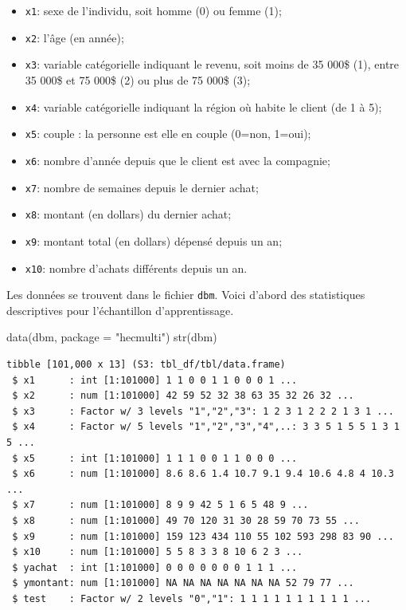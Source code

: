 \documentclass[
  11pt,
  letterpaper,
]{scrbook}
\newenvironment{Shaded}{\begin{snugshade}}{\end{snugshade}}
\newcommand{\AttributeTok}[1]{\textcolor[rgb]{0.40,0.45,0.13}{#1}}
\newcommand{\FunctionTok}[1]{\textcolor[rgb]{0.28,0.35,0.67}{#1}}
\newcommand{\NormalTok}[1]{\textcolor[rgb]{0.00,0.23,0.31}{#1}}
\newcommand{\StringTok}[1]{\textcolor[rgb]{0.13,0.47,0.30}{#1}}
\providecommand{\tightlist}{%
  \setlength{\itemsep}{0pt}\setlength{\parskip}{0pt}}\usepackage{longtable,booktabs,array}
\theoremstyle{definition}
\theoremstyle{remark}
\begin{document}
\begin{itemize}
\tightlist
\item
  \texttt{x1}: sexe de l'individu, soit homme (0) ou femme (1);
\item
  \texttt{x2}: l'âge (en année);
\item
  \texttt{x3}: variable catégorielle indiquant le revenu, soit moins de
  35 000\$ (1), entre 35 000\$ et 75 000\$ (2) ou plus de 75 000\$ (3);
\item
  \texttt{x4}: variable catégorielle indiquant la région où habite le
  client (de 1 à 5);
\item
  \texttt{x5}: couple : la personne est elle en couple (0=non, 1=oui);
\item
  \texttt{x6}: nombre d'année depuis que le client est avec la
  compagnie;
\item
  \texttt{x7}: nombre de semaines depuis le dernier achat;
\item
  \texttt{x8}: montant (en dollars) du dernier achat;
\item
  \texttt{x9}: montant total (en dollars) dépensé depuis un an;
\item
  \texttt{x10}: nombre d'achats différents depuis un an.
\end{itemize}

Les données se trouvent dans le fichier \texttt{dbm}. Voici d'abord des
statistiques descriptives pour l'échantillon d'apprentissage.

\begin{Shaded}
\begin{Highlighting}[]
\FunctionTok{data}\NormalTok{(dbm, }\AttributeTok{package =} \StringTok{"hecmulti"}\NormalTok{)}
\FunctionTok{str}\NormalTok{(dbm)}
\end{Highlighting}
\end{Shaded}

\begin{verbatim}
tibble [101,000 x 13] (S3: tbl_df/tbl/data.frame)
 $ x1      : int [1:101000] 1 1 0 0 1 1 0 0 0 1 ...
 $ x2      : num [1:101000] 42 59 52 32 38 63 35 32 26 32 ...
 $ x3      : Factor w/ 3 levels "1","2","3": 1 2 3 1 2 2 2 1 3 1 ...
 $ x4      : Factor w/ 5 levels "1","2","3","4",..: 3 3 5 1 5 5 1 3 1 5 ...
 $ x5      : int [1:101000] 1 1 1 0 0 1 1 0 0 0 ...
 $ x6      : num [1:101000] 8.6 8.6 1.4 10.7 9.1 9.4 10.6 4.8 4 10.3 ...
 $ x7      : num [1:101000] 8 9 9 42 5 1 6 5 48 9 ...
 $ x8      : num [1:101000] 49 70 120 31 30 28 59 70 73 55 ...
 $ x9      : num [1:101000] 159 123 434 110 55 102 593 298 83 90 ...
 $ x10     : num [1:101000] 5 5 8 3 3 8 10 6 2 3 ...
 $ yachat  : int [1:101000] 0 0 0 0 0 0 0 1 1 1 ...
 $ ymontant: num [1:101000] NA NA NA NA NA NA NA 52 79 77 ...
 $ test    : Factor w/ 2 levels "0","1": 1 1 1 1 1 1 1 1 1 1 ...
\end{verbatim}
\end{document}
